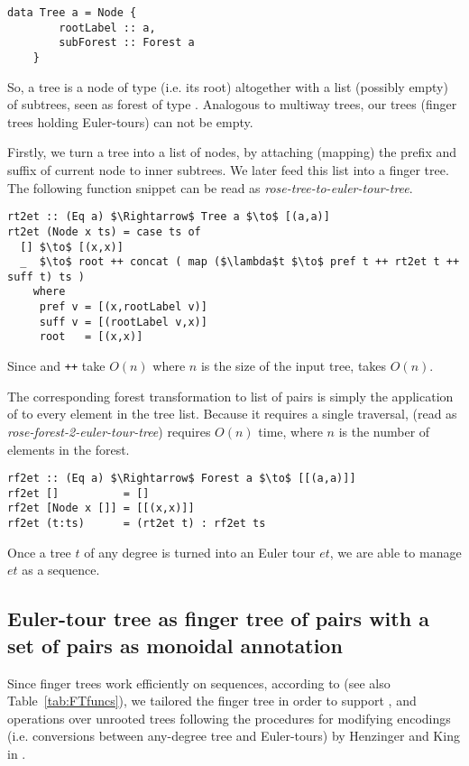 \begin{lstlisting}
data Tree a = Node {
        rootLabel :: a,         
        subForest :: Forest a   
    }
\end{lstlisting}

So, a tree is a node of type  (i.e. its root) altogether with a list (possibly empty) of subtrees, seen as forest of type . Analogous to multiway trees, our trees (finger trees holding Euler-tours) can not be empty. 

Firstly, we turn a tree into a list of nodes, by attaching (mapping) the prefix and suffix of current node to inner subtrees. We later feed this list into a finger tree. The following function snippet can be read as \textit{rose-tree-to-euler-tour-tree}.

\begin{lstlisting}[mathescape] 
rt2et :: (Eq a) $\Rightarrow$ Tree a $\to$ [(a,a)] 
rt2et (Node x ts) = case ts of
  [] $\to$ [(x,x)]
  _  $\to$ root ++ concat ( map ($\lambda$t $\to$ pref t ++ rt2et t ++ suff t) ts )   
    where
     pref v = [(x,rootLabel v)]
     suff v = [(rootLabel v,x)]
     root   = [(x,x)] 
\end{lstlisting} 

Since  and \texttt{++} take $O(n)$ where $n$ is the size of the input tree,  takes $O(n)$. 

The corresponding forest transformation to list of pairs is simply the application of  to every element in the tree list. Because it requires a single traversal,  (read as \textit{rose-forest-2-euler-tour-tree}) requires $O(n)$ time, where $n$ is the number of elements in the forest. 

\begin{lstlisting}[mathescape] 
rf2et :: (Eq a) $\Rightarrow$ Forest a $\to$ [[(a,a)]]
rf2et []          = []
rf2et [Node x []] = [[(x,x)]]  
rf2et (t:ts)      = (rt2et t) : rf2et ts
\end{lstlisting}

Once a tree $t$ of any degree is turned into an Euler tour $et$, we are able to manage $et$ as a sequence. 


\subsection{Euler-tour tree as finger tree of pairs with a set of pairs as monoidal annotation}

Since finger trees work efficiently on sequences, according to \cite{FTs} (see also Table~\ref{tab:FTfuncs}), we tailored the finger tree in order to support \link, \cut and \conn operations over unrooted trees following the procedures for modifying encodings (i.e. conversions between any-degree tree and Euler-tours) by Henzinger and King in \cite{Rand-DynGs-Algos}.

